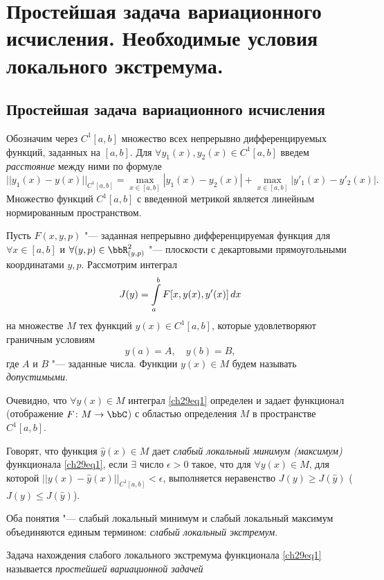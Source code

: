 \chapter{Простейшая задача вариационного исчисления. Необходимые условия локального экстремума.}
\section{Простейшая задача вариационного исчисления} 
Обозначим через $C^1[a,b]$ множество всех непрерывно дифференцируемых функций, заданных на $[a,b]$. Для $\forall y_1(x),y_2(x)\in C^1[a,b]$ введем \textit{расстояние} между ними по формуле
$$
||y_1(x)-y(x)||_{C^1[a,b]}=\max_{x\in [a,b]}\limits |y_1(x)-y_2(x)|+\max_{x\in[a,b]}\limits |y'_1(x)-y'_2(x)|. 
$$ 
Множество функций $C^1[a,b]$ с введенной метрикой является линейным нормированным пространством.

Пусть $F(x,y,p)$ "--- заданная непрерывно дифференцируемая функция для $\forall x\in [a,b]$ и $\forall(y,p)\in \bbR^2_{(y,p)}$ "--- плоскости с декартовыми прямоугольными координатами $y,p$. Рассмотрим интеграл
\begin{equation}\label{ch29eq1}
J(y)=\int_a^b\limits F[x,y(x),y'(x)]\,dx
\end{equation}
на множестве $M$ тех функций $y(x)\in C^1[a,b]$, которые удовлетворяют граничным условиям
\begin{equation}\label{ch29eq2}
y(a)=A,\quad y(b)=B,
\end{equation}
где $A$ и $B$ "--- заданные числа. Функции $y(x)\in M$ будем называть \textit{допустимыми}.

Очевидно, что $\forall y(x)\in M$ интеграл \eqref{ch29eq1} определен и задает функционал (отображение $F \colon M \to \bbC$) с областью определения $M$ в пространстве $C^1[a,b]$.

\begin{defn}
Говорят, что функция $\hat{y}(x)\in M$ дает \textit{слабый локальный минимум (максимум)} функционала \eqref{ch29eq1}, если $\exists$ число $\epsilon>0$ такое, что для $\forall y(x)\in M$, для которой $||y(x)-\hat{y}(x)||_{C^1[a,b]}<\epsilon$, выполняется неравенство $J(y)\geq J(\hat{y})$ ($J(y)\leq J(\hat{y})$).
\end{defn}

Оба понятия "--- слабый локальный минимум и слабый локальный максимум объединяются единым термином: \textit{слабый локальный экстремум}.

\begin{defn}
Задача нахождения слабого локального экстремума функционала \eqref{ch29eq1} называется \textit{простейшей вариационной задачей}
\end{defn}

